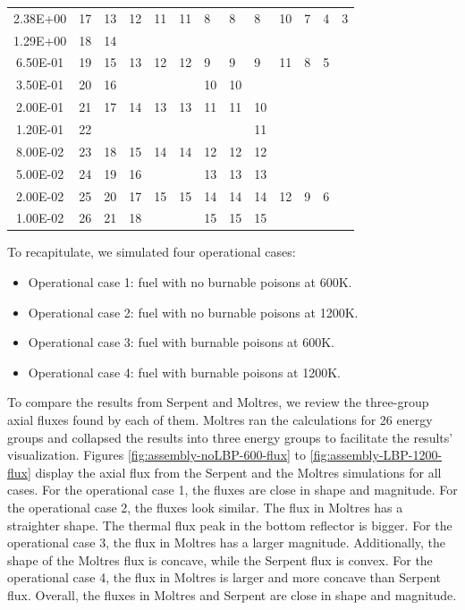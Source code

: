\begin{table}[htbp!]
\begin{tabular}{c|llllllllllll}
  2.38E+00            & 17    & 13   & 12   & 11  & 11  & 8   & 8   & 8     & 10  & 7  & 4  & 3 \\ 
  1.29E+00            & 18    & 14   &      &     &     &     &     &       &     &    &    &   \\ 
  6.50E-01            & 19    & 15   & 13   & 12  & 12  & 9   & 9   & 9     & 11  & 8  & 5  &   \\ 
  3.50E-01            & 20    & 16   &      &     &     & 10  & 10  &       &     &    &    &   \\ 
  2.00E-01            & 21    & 17   & 14   & 13  & 13  & 11  & 11  & 10    &     &    &    &   \\ 
  1.20E-01            & 22    &      &      &     &     &     &     & 11    &     &    &    &   \\ 
  8.00E-02            & 23    & 18   & 15   & 14  & 14  & 12  & 12  & 12    &     &    &    &   \\ 
  5.00E-02            & 24    & 19   & 16   &     &     & 13  & 13  & 13    &     &    &    &   \\ 
  2.00E-02            & 25    & 20   & 17   & 15  & 15  & 14  & 14  & 14    & 12  & 9  & 6  &   \\ 
  1.00E-02            & 26    & 21   & 18   &     &     & 15  & 15  & 15    &     &    &    &   \\ 
  \bottomrule
  \end{tabular}
  \label{tab:energygroups}
\end{table}

To recapitulate, we simulated four operational cases: 
\begin{itemize}
  \item Operational case 1: fuel with no burnable poisons at 600K.
  \item Operational case 2: fuel with no burnable poisons at 1200K.
  \item Operational case 3: fuel with burnable poisons at 600K.
  \item Operational case 4: fuel with burnable poisons at 1200K.
\end{itemize}

To compare the results from Serpent and Moltres, we review the three-group axial fluxes found by each of them.
Moltres ran the calculations for 26 energy groups and collapsed the results into three energy groups to facilitate the results' visualization.
Figures \ref{fig:assembly-noLBP-600-flux} to \ref{fig:assembly-LBP-1200-flux} display the axial flux from the Serpent and the Moltres simulations for all cases.
For the operational case 1, the fluxes are close in shape and magnitude.
For the operational case 2, the fluxes look similar.
The flux in Moltres has a straighter shape.
The thermal flux peak in the bottom reflector is bigger.
For the operational case 3, the flux in Moltres has a larger magnitude.
Additionally, the shape of the Moltres flux is concave, while the Serpent flux is convex.
For the operational case 4, the flux in Moltres is larger and more concave than Serpent flux.
Overall, the fluxes in Moltres and Serpent are close in shape and magnitude.

